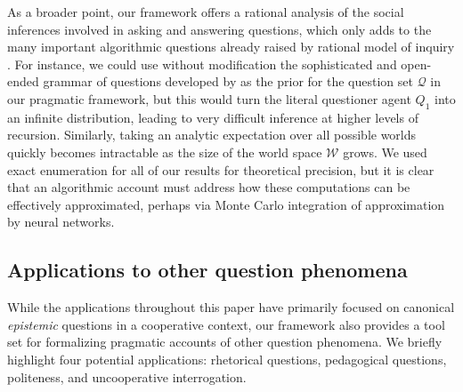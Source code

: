 \documentclass[11pt, floatsintext]{apa6}
\begin{document}
As a broader point, our framework offers a rational analysis of the social inferences involved in asking and answering questions, which only adds to the many important algorithmic questions already raised by rational model of inquiry .
For instance, we could use without modification the sophisticated and open-ended grammar of questions developed by  as the prior for the question set $\mathcal{Q}$ in our pragmatic framework, but this would turn the literal questioner agent $Q_1$ into an infinite distribution, leading to very difficult inference at higher levels of recursion.
Similarly, taking an analytic expectation over all possible worlds quickly becomes intractable as the size of the world space $\mathcal{W}$ grows.
We used exact enumeration for all of our results for theoretical precision, but it is clear that an algorithmic account must address how these computations can be effectively approximated, perhaps via Monte Carlo integration of approximation by neural networks.



\subsection{Applications to other question phenomena}

While the applications throughout this paper have primarily focused on canonical \emph{epistemic} questions in a cooperative context, our framework also provides a tool set for formalizing pragmatic accounts of other question phenomena. 
We briefly highlight four potential applications: rhetorical questions, pedagogical questions, politeness, and uncooperative interrogation.
\end{document}
